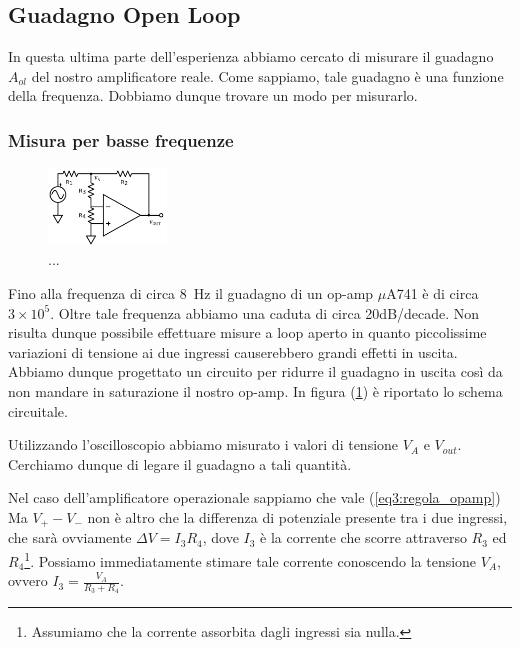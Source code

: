 \subsection{Guadagno Open Loop}

In questa ultima parte dell'esperienza abbiamo cercato di misurare il guadagno $A_{ol}$ del nostro amplificatore reale. Come sappiamo, tale guadagno è una funzione della frequenza. Dobbiamo dunque trovare un modo per misurarlo.

\subsubsection{Misura per basse frequenze}

\begin{figure}
  \begin{center}
    \includegraphics[width=0.280\textwidth]{../E03/latex/LF_ol.pdf}
  \end{center}
  \caption{...}
  \label{cir3:low_frequency}
\end{figure}


Fino alla frequenza di circa \SI{8}{\hertz} il guadagno di un op-amp $\mu$A741 è di circa $3\times 10^5$. Oltre tale frequenza abbiamo una caduta di circa 20dB/decade. Non risulta dunque possibile effettuare misure a loop aperto in quanto piccolissime variazioni di tensione ai due ingressi causerebbero grandi effetti in uscita. Abbiamo dunque progettato un circuito per ridurre il guadagno in uscita così da non mandare in saturazione il nostro op-amp. In figura (\ref{cir3:low_frequency}) è riportato lo schema circuitale.  

Utilizzando l'oscilloscopio abbiamo misurato i valori di tensione $V_A$ e $V_{out}$. Cerchiamo dunque di legare il guadagno a tali quantità.

Nel caso dell'amplificatore operazionale sappiamo che vale (\ref{eq3:regola_opamp}) Ma $V_+-V_-$ non è altro che la differenza di potenziale presente tra i due ingressi, che sarà ovviamente $\Delta V = I_3R_4$, dove $I_3$ è la corrente che scorre attraverso $R_3$ ed $R_4$\footnote{Assumiamo che la corrente assorbita dagli ingressi sia nulla.}. Possiamo immediatamente stimare tale corrente conoscendo la tensione $V_A$, ovvero $I_3=\frac{V_A}{R_3+R_4}$. 


